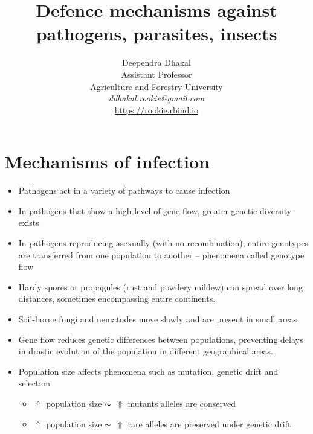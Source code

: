 \documentclass[11pt,dvipsnames,ignorenonframetext,aspectratio=169]{beamer}
\title[]{Defence mechanisms against pathogens, parasites, insects}
\author[
        \vspace{-0.5cm}Deependra Dhakal\\
Assistant Professor\\
Agriculture and Forestry University\\
\textit{ddhakal.rookie@gmail.com}\\
\url{https://rookie.rbind.io}
    ]{\vspace{-0.5cm}Deependra Dhakal\\
Assistant Professor\\
Agriculture and Forestry University\\
\textit{ddhakal.rookie@gmail.com}\\
\url{https://rookie.rbind.io}}
\date[
      
  ]{
    }
\providecommand{\tightlist}{%
  \setlength{\itemsep}{0pt}\setlength{\parskip}{0pt}}
\begin{document}
  \begin{frame}[plain]
  \titlepage
  \end{frame}



\hypertarget{mechanisms-of-infection}{%
\section{Mechanisms of infection}\label{mechanisms-of-infection}}

\begin{frame}{}
\protect\hypertarget{section}{}
\footnotesize

\begin{itemize}
\tightlist
\item
  Pathogens act in a variety of pathways to cause infection
\item
  In pathogens that show a high level of gene flow, greater genetic
  diversity exists
\item
  In pathogens reproducing asexually (with no recombination), entire
  genotypes are transferred from one population to another -- phenomena
  called genotype flow
\item
  Hardy spores or propagules (rust and powdery mildew) can spread over
  long distances, sometimes encompassing entire continents.
\item
  Soil-borne fungi and nematodes move slowly and are present in small
  areas.
\item
  Gene flow reduces genetic differences between populations, preventing
  delays in drastic evolution of the population in different
  geographical areas.
\item
  Population size affects phenomena such as mutation, genetic drift and
  selection

  \begin{itemize}
  \footnotesize
  \item $\Uparrow$ population size $\thicksim$ $\Uparrow$ mutants alleles are conserved
  \item $\Uparrow$ population size $\thicksim$ $\Uparrow$ rare alleles are preserved under genetic drift 
  \end{itemize}
\end{itemize}
\end{frame}
\end{document}

